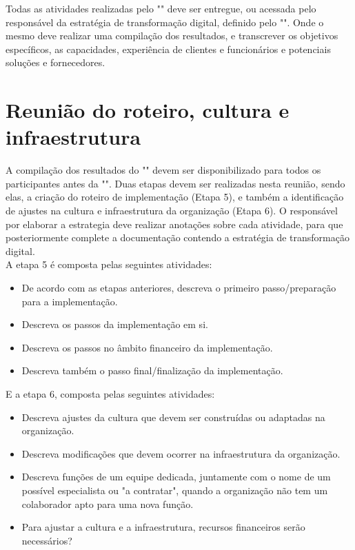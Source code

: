 Todas as atividades realizadas pelo "" deve ser entregue, ou acessada pelo responsável da estratégia de transformação digital, definido pelo "". Onde o mesmo deve realizar uma compilação dos resultados, e transcrever os objetivos específicos, as capacidades, experiência de clientes e funcionários e potenciais soluções e fornecedores.

\section{Reunião do roteiro, cultura e infraestrutura}\label{sec:reuniaoRoteiroCulturaInfraestrutura}

A compilação dos resultados do "" devem ser disponibilizado para todos os participantes antes da "". Duas etapas devem ser realizadas nesta reunião, sendo elas, a criação do roteiro de implementação (Etapa 5), e também a identificação de ajustes na cultura e infraestrutura da organização (Etapa 6). O responsável por elaborar a estrategia deve realizar anotações sobre cada atividade, para que posteriormente complete a documentação contendo a estratégia de transformação digital.\\

A etapa 5 é composta pelas seguintes atividades:
\begin{itemize}
    \item De acordo com as etapas anteriores, descreva o primeiro passo/preparação para a implementação.
    
    \item Descreva os passos da implementação em si.
    
    \item Descreva os passos no âmbito financeiro da implementação.
    
    \item Descreva também o passo final/finalização da implementação.\\
\end{itemize}

E a etapa 6, composta pelas seguintes atividades:
\begin{itemize}
    \item Descreva ajustes da cultura que devem ser construídas ou adaptadas na organização.
    
    \item Descreva modificações que devem ocorrer na infraestrutura da organização.
    
    \item Descreva funções de um equipe dedicada, juntamente com o nome de um possível especialista ou "a contratar", quando a organização não tem um colaborador apto para uma nova função.
    
    \item Para ajustar a cultura e a infraestrutura, recursos financeiros serão necessários?
\end{itemize}



